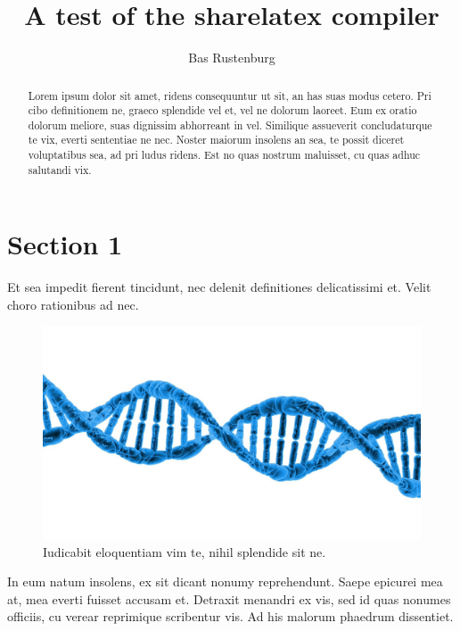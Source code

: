 \documentclass[a4paper,10pt]{article}
\title{A test of the sharelatex compiler}
\author{Bas Rustenburg}
\begin{document}
\maketitle

\begin{abstract}
Lorem ipsum dolor sit amet, ridens consequuntur ut sit, an has suas modus cetero.
Pri cibo definitionem ne, graeco splendide vel et, vel ne dolorum laoreet. \cite{rasbastenburg2014}
Eum ex oratio dolorum meliore, suas dignissim abhorreant in vel.
Similique assueverit concludaturque te vix, everti sententiae ne nec.
Noster maiorum insolens an sea, te possit diceret voluptatibus sea, ad pri ludus ridens.
Est no quas nostrum maluisset, cu quas adhuc salutandi vix.
\end{abstract}



\section{Section 1}
Et sea impedit fierent tincidunt, nec delenit definitiones delicatissimi et.
Velit choro rationibus ad nec.

\begin{figure}[H]
 \centering
 \includegraphics[width=\textwidth,keepaspectratio=true]{./dna.jpg}
 \caption{Iudicabit eloquentiam vim te, nihil splendide sit ne.}
 \label{fig:dna}
\end{figure}

In eum natum insolens, ex sit dicant nonumy reprehendunt.
Saepe epicurei mea at, mea everti fuisset accusam et.
Detraxit menandri ex vis, sed id quas nonumes officiis, cu verear reprimique scribentur vis.
Ad his malorum phaedrum dissentiet.

\end{document}

